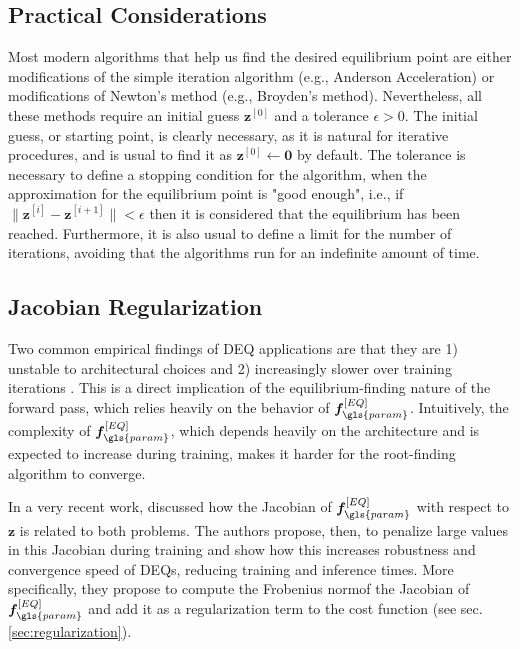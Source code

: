 \subsection{Practical Considerations}

Most modern algorithms that help us find the desired equilibrium point are either modifications of the simple iteration algorithm (e.g., Anderson Acceleration\cite{walker_anderson_2011}) or modifications of Newton's method (e.g., Broyden's method\cite{broyden_class_1965}).
Nevertheless, all these methods require an initial guess $\bm{z}^{[0]}$ and a tolerance $\epsilon>0$. 
The initial guess, or starting point, is clearly necessary, as it is natural for iterative procedures, and is usual to find it as $\bm{z}^{[0]}\gets \bm{0}$ by default.
The tolerance is necessary to define a stopping condition for the algorithm, when the approximation for the equilibrium point is "good enough", i.e., if $\|\bm{z}^{[i]}-\bm{z}^{[i+1]}\|<\epsilon$ then it is considered that the equilibrium has been reached.
Furthermore, it is also usual to define a limit for the number of iterations, avoiding that the algorithms run for an indefinite amount of time.

\subsection{Jacobian Regularization}

Two common empirical findings of \gls{DEQ} applications are that they are 1) unstable to architectural choices \cite{bai_stabilizing_2021} and 2) increasingly slower over training iterations \cite{Bai2019,winston_monotone_2020}.
This is a direct implication of the equilibrium-finding nature of the forward pass, which relies heavily on the behavior of $\bm{f}_{\gls{param}}^{[EQ]}$.
Intuitively, the complexity of $\bm{f}_{\gls{param}}^{[EQ]}$, which depends heavily on the architecture and is expected to increase during training, makes it harder for the root-finding algorithm to converge.

In a very recent work, \textcite{bai_stabilizing_2021} discussed how the Jacobian of $\bm{f}_{\gls{param}}^{[EQ]}$ with respect to $\bm{z}$ is related to both problems.
The authors propose, then, to penalize large values in this Jacobian during training and show how this increases robustness and convergence speed of \gls{DEQ}s, reducing training and inference times.
More specifically, they propose to compute the Frobenius norm\footnotemark of the Jacobian of $\bm{f}_{\gls{param}}^{[EQ]}$ and add it as a regularization term to the cost function (see sec. \ref{sec:regularization}).

